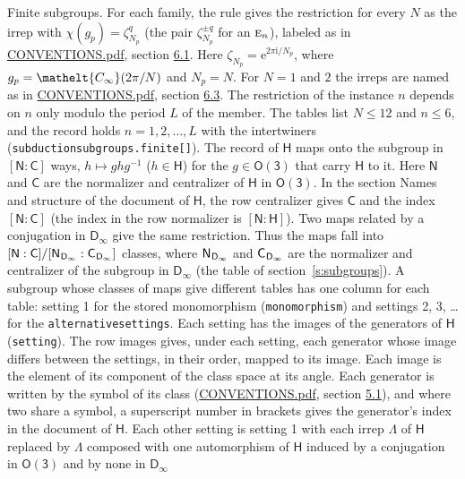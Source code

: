 \documentclass[10pt,a4paper]{article}
\makeatletter
\renewcommand\paragraph{\@startsection{paragraph}{4}{\z@}{1.5ex plus .5ex minus .2ex}{-1em}%
  {\normalfont\small\sffamily\bfseries\color{parttitle}}}
\numberwithin{equation}{section}
\newcommand{\eltfont}[1]{{\let\sigma\eltsigma\mathelt{#1}}}
\newcommand{\grp}[1]{\mathsf{#1}}
\newcommand{\irr}[1]{\text{\normalfont\scshape #1}}
\newcommand{\elt}[1]{\eltfont{#1}}
\newcommand{\grpindex}[2]{[#1 : #2]}
\newcommand{\iunit}{\mathrm{i}}
\newcommand{\expe}{\mathrm{e}}
\newcommand{\rootunity}[1]{\zeta_{#1}}
\newcommand{\period}{L}
\newcommand{\hairsp}{\mkern1mu}
\makeatother
\begin{document}
\paragraph{Finite subgroups.} \label{n:function.character.plain}\label{n:element.principal}\label{n:constant.root}\label{n:index.residue}\label{n:index.order.principal}For each family, the rule gives the restriction for every $N$ as the irrep with $\chi(g_p) = \rootunity{N_p}^{q}$ (the pair $\rootunity{N_p}^{\pm q}$ for an $\irr{e}_n$), labeled as in \href{../../CONVENTIONS.pdf}{CONVENTIONS.pdf}, section \href{../../CONVENTIONS.pdf\#conv.6.1}{6.1}. Here $\rootunity{N_p} = \expe^{2\pi\iunit/N_p}$, where $g_p = \elt{C_\infty}(2\pi/N)$ and $N_p = N$. For $N = 1$ and $2$ the irreps are named as in \href{../../CONVENTIONS.pdf}{CONVENTIONS.pdf}, section \href{../../CONVENTIONS.pdf\#conv.6.3}{6.3}. \label{n:index.period}The restriction of the instance $n$ depends on $n$ only modulo the period $\period$ of the member. The tables list $N \le 12$ and $n \le 6$, and the record holds $n = 1, 2, \dots, \period$ with the intertwiners (\texttt{subductionsubgroups.finite[]}). \label{n:group.normalizer.o3}\label{n:group.centralizer.o3}\label{n:element.h}The record of $\grp{H}$ maps onto the subgroup in $\grpindex{\grp{N}}{\grp{C}}$ ways, $h \mapsto g h g^{-1}$ ($h \in \grp{H}$) for the $g \in \grp{O(3)}$ that carry $\grp{H}$ to it. Here $\grp{N}$ and $\grp{C}$ are the normalizer and centralizer of $\grp{H}$ in \href{O3.pdf}{$\grp{O(3)}$}. In the section Names and structure of the document of $\grp{H}$, the row centralizer gives $\grp{C}$ and the index $\grpindex{\grp{N}}{\grp{C}}$ (the index in the row normalizer is $\grpindex{\grp{N}}{\grp{H}}$). Two maps related by a conjugation in $\grp{D_{\infty}}$ give the same restriction. Thus the maps fall into $\grpindex{\grp{N}}{\grp{C}}/\grpindex{\grp{N}_{\hairsp \grp{D_{\infty}}}}{\grp{C}_{\hairsp \grp{D_{\infty}}}}$ classes, where $\grp{N}_{\hairsp \grp{D_{\infty}}}$ and $\grp{C}_{\hairsp \grp{D_{\infty}}}$ are the normalizer and centralizer of the subgroup in $\grp{D_{\infty}}$ (the table of section~\ref{s:subgroups}). \label{n:head.setting}A subgroup whose classes of maps give different tables has one column for each table: setting 1 for the stored monomorphism (\texttt{monomorphism}) and settings 2, 3, \dots{} for the \texttt{alternativesettings}. Each setting has the images of the generators of $\grp{H}$ (\texttt{setting}). \label{n:head.images}The row images gives, under each setting, each generator whose image differs between the settings, in their order, mapped to its image. Each image is the element of its component of the class space at its angle. \label{n:element.generator.index}Each generator is written by the symbol of its class (\href{../../CONVENTIONS.pdf}{CONVENTIONS.pdf}, section \href{../../CONVENTIONS.pdf\#conv.5.1}{5.1}), and where two share a symbol, a superscript number in brackets gives the generator's index in the document of $\grp{H}$. \label{n:irrep.Delta}Each other setting is setting 1 with each irrep $\Lambda$ of $\grp{H}$ replaced by $\Lambda$ composed with one automorphism of $\grp{H}$ induced by a conjugation in \href{O3.pdf}{$\grp{O(3)}$} and by none in $\grp{D_{\infty}}$ 
\end{document}
